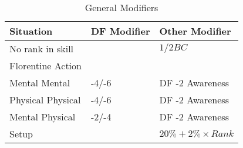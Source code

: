 
\begin{table}[h]
	\begin{tabular}{lll}
	Situation			& DF Modifier	& Other Modifier \\ 
	\hline
	No rank in skill 	& 				& \(1/2 BC \)	 \\
	Florentine Action	& 				& 					\\  \hline
	Mental Mental		& -4/-6			& DF -2 Awareness \\
	Physical Physical	& -4/-6			& DF -2 Awareness	\\
	Mental Physical		& -2/-4			& DF -2 Awareness	\\
	Setup				& 				& \( 20\% + 2\% \times Rank \) \\ 
    \end{tabular}
    \caption{General Modifiers}
\end{table}
